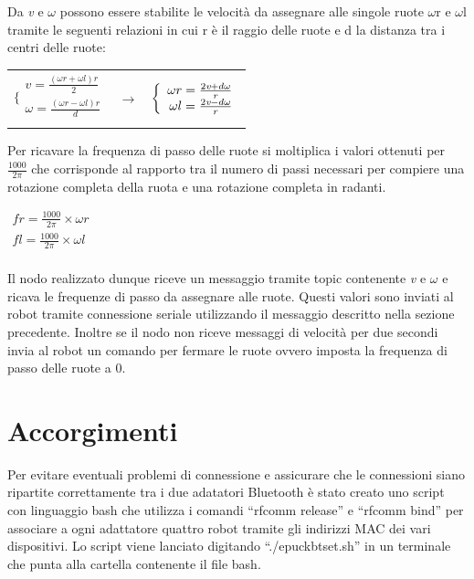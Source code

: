 	Da \emph{v} e $\omega$ possono essere stabilite le velocit\`a da assegnare alle singole ruote $\omega$r e $\omega$l tramite le seguenti relazioni in cui r \`e il raggio delle ruote e d la distanza tra i centri delle ruote:
	
	\begin{center}		
	\begin{tabular}{ccc}
			$\bigg \{
				\begin{array}{r}
				v=\frac{(\omega r+\omega l)r}{2}\\
				\omega = \frac{(\omega r-\omega l)r}{d}\\
				\end{array}$ 
 	& $\to$
 	&$\bigg \{
 		\begin{array}{r}
 		\omega r=\frac{2\emph{v}+d\omega }{r}\\
 		\omega l= \frac{2\emph{v}-d\omega}{r}\\
 		\end{array}$   \\ 
	\end{tabular} 
	\end{center}
	
	
	Per ricavare la frequenza di passo delle ruote si moltiplica i valori ottenuti per  $\frac{1000}{2\pi}$ che corrisponde al rapporto tra il numero di passi necessari per compiere una rotazione completa della ruota e una rotazione completa in radanti.
	
	\begin{center}	
	$\begin{array}{r}
	 		fr=\frac{1000}{2\pi}\times \omega r\\ 
	 		fl= \frac{1000}{2\pi}\times \omega l\\
	 		\end{array}$
	\end{center}
	
	Il nodo realizzato dunque riceve un messaggio tramite topic contenente \emph{v} e $\omega$ e ricava le frequenze di passo da assegnare alle ruote.
	Questi valori sono inviati al robot tramite connessione seriale utilizzando il messaggio descritto nella sezione precedente.
	Inoltre se il nodo non riceve messaggi di velocit\`a per due secondi invia al robot un comando per fermare le ruote ovvero imposta la frequenza di passo delle ruote a 0.
	
\section{Accorgimenti}
	Per evitare eventuali problemi di connessione e assicurare che le connessioni siano ripartite correttamente tra i due adatatori Bluetooth \`e stato creato uno script con linguaggio bash che utilizza i comandi ``rfcomm release'' e ``rfcomm bind'' per associare a ogni adattatore quattro robot tramite gli indirizzi MAC dei vari dispositivi.
	Lo script viene lanciato digitando ``./epuckbtset.sh'' in un terminale che punta alla cartella contenente il file bash.
	 	
	



